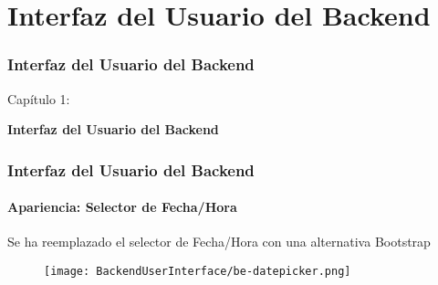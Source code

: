%

\section{Interfaz del Usuario del Backend}
\begin{frame}[fragile]
	\frametitle{Interfaz del Usuario del Backend}

	\begin{center}\huge{Capítulo 1:}\end{center}
	\begin{center}\huge{\color{typo3darkgrey}\textbf{Interfaz del Usuario del Backend}}\end{center}

\end{frame}


\begin{frame}[fragile]
	\frametitle{Interfaz del Usuario del Backend}
	\framesubtitle{Apariencia: Selector de Fecha/Hora}

	Se ha reemplazado el selector de Fecha/Hora con una alternativa Bootstrap
	\begin{figure}
		\texttt{[image: BackendUserInterface/be-datepicker.png]}
	\end{figure}

\end{frame}


